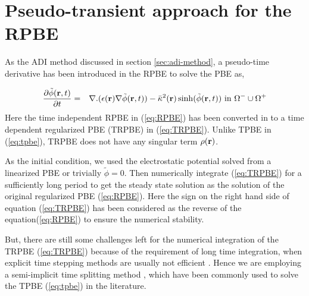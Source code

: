 \section{Pseudo-transient approach for the RPBE}

As the ADI method discussed in section \ref{sec:adi-method}, a pseudo-time derivative has been introduced in the RPBE to solve the PBE as,  

\begin{eqnarray}
	 	\frac{\partial \tilde\phi(\textbf{r},t)}{\partial t} &=& \nabla.(\epsilon({\bf r}) \nabla \tilde\phi(\textbf{r},t))-\bar\kappa^2({\bf r}) \sinh(\tilde\phi(\textbf{r},t)) \text{ in } \Omega^- \cup \Omega^+ \label{eq:TRPBE} %
\end{eqnarray}
Here the time independent RPBE in (\ref{eq:RPBE}) has been converted in to a time dependent regularized PBE (TRPBE) in (\ref{eq:TRPBE}). Unlike TPBE in (\ref{eq:tpbe}), TRPBE does not have any singular term $\rho({\bf r})$.   

As the initial condition, we used the electrostatic potential solved from a linearized PBE \cite{Zhao2011} or trivially $\tilde \phi= 0$. Then numerically integrate (\ref{eq:TRPBE}) for a sufficiently long period to get the steady state solution as the solution of the original regularized PBE (\ref{eq:RPBE}). Here the sign on the right hand side of equation (\ref{eq:TRPBE}) has been considered as the reverse of the equation(\ref{eq:RPBE}) to ensure the numerical stability. 

But, there are still some challenges left for the numerical integration of the TRPBE (\ref{eq:TRPBE}) because of the requirement of long time integration, when explicit time stepping methods are usually not efficient \cite{Sayyed-Ahmad2004,Shestakov2002,Zhao2011,zhao_operator_2014}. Hence we are employing a semi-implicit time splitting method \cite{Sayyed-Ahmad2004,Shestakov2002}, which have been commonly used to solve the TPBE (\ref{eq:tpbe}) in the literature. 

